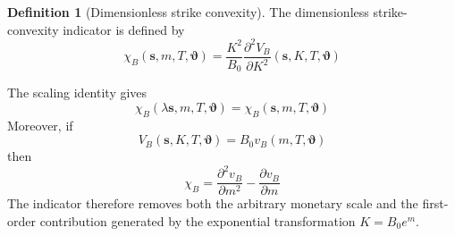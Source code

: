 \documentclass{article}
\numberwithin{equation}{subsection}
\theoremstyle{definition}
\newtheorem{definition}[theorem]{Definition}
\theoremstyle{remark}
\begin{document}
\begin{definition}[Dimensionless strike convexity]
The dimensionless strike-convexity indicator is defined by
\begin{equation}
\chi_B(\boldsymbol{s},m,T,\boldsymbol{\vartheta})
=
\frac{K^2}{B_0}
\frac{\partial^2V_B}{\partial K^2}
(\boldsymbol{s},K,T,\boldsymbol{\vartheta})
\end{equation}
\end{definition}
The scaling identity gives
\begin{equation}
\chi_B
(
\lambda\boldsymbol{s},m,T,\boldsymbol{\vartheta}
)
=
\chi_B
(
\boldsymbol{s},m,T,\boldsymbol{\vartheta}
)
\end{equation}
Moreover, if
\begin{equation}
V_B(\boldsymbol{s},K,T,\boldsymbol{\vartheta})
=
B_0
v_B(m,T,\boldsymbol{\vartheta})
\end{equation}
then
\begin{equation}
\chi_B
=
\frac{\partial^2v_B}{\partial m^2}
-
\frac{\partial v_B}{\partial m}
\end{equation}
The indicator therefore removes both the arbitrary monetary scale and the first-order contribution generated by the exponential transformation \(K=B_0e^m\).
\end{document}
